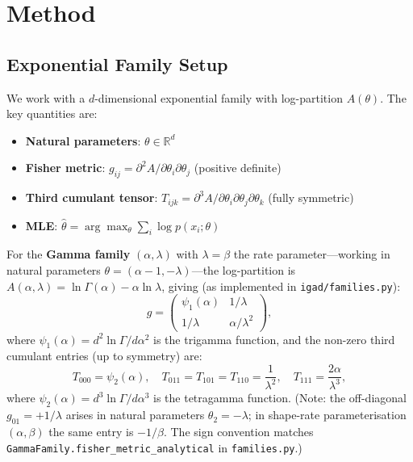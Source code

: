 \documentclass[12pt]{article}
\begin{document}
\section{Method}
\label{sec:method}

\subsection{Exponential Family Setup}

We work with a $d$-dimensional exponential family with log-partition $A(\theta)$.
The key quantities are:
\begin{itemize}
  \item \textbf{Natural parameters}: $\theta \in \mathbb{R}^d$
  \item \textbf{Fisher metric}: $g_{ij} = \partial^2 A/\partial\theta_i\partial\theta_j$ (positive definite)
  \item \textbf{Third cumulant tensor}: $T_{ijk} = \partial^3 A/\partial\theta_i\partial\theta_j\partial\theta_k$ (fully symmetric)
  \item \textbf{MLE}: $\hat{\theta} = \arg\max_\theta \sum_i \log p(x_i;\theta)$
\end{itemize}

For the \textbf{Gamma family} $(\alpha,\lambda)$ with $\lambda=\beta$ the rate
parameter---working in natural parameters $\theta=(\alpha-1,-\lambda)$---the
log-partition is $A(\alpha,\lambda)=\ln\Gamma(\alpha)-\alpha\ln\lambda$,
giving (as implemented in \texttt{igad/families.py}):
\begin{equation}
  g = \begin{pmatrix} \psi_1(\alpha) & 1/\lambda \\ 1/\lambda & \alpha/\lambda^2 \end{pmatrix},
  \label{eq:gamma-metric}
\end{equation}
where $\psi_1(\alpha) = d^2\ln\Gamma/d\alpha^2$ is the trigamma function, and
the non-zero third cumulant entries (up to symmetry) are:
\begin{equation}
  T_{000} = \psi_2(\alpha),\quad
  T_{011} = T_{101} = T_{110} = \frac{1}{\lambda^2},\quad
  T_{111} = \frac{2\alpha}{\lambda^3},
  \label{eq:gamma-T}
\end{equation}
where $\psi_2(\alpha) = d^3\ln\Gamma/d\alpha^3$ is the tetragamma function.
(Note: the off-diagonal $g_{01}=+1/\lambda$ arises in natural parameters
$\theta_2=-\lambda$; in shape-rate parameterisation $(\alpha,\beta)$ the same
entry is $-1/\beta$. The sign convention matches \texttt{GammaFamily.fisher\_metric\_analytical} in \texttt{families.py}.)
\end{document}
